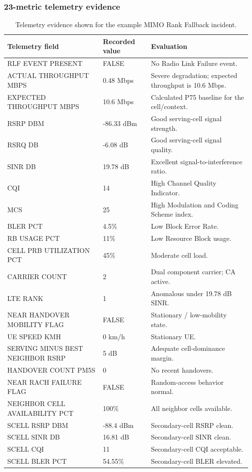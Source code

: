 \documentclass[11pt,a4paper]{article}
\begin{document}
\subsubsection{23-metric telemetry evidence}
\begin{table}[H]
\centering
\scriptsize
\begin{tabularx}{0.98\textwidth}{L{4.5cm} L{3.0cm} Y}
\toprule
\textbf{Telemetry field} & \textbf{Recorded value} & \textbf{Evaluation} \\
\midrule
RLF EVENT PRESENT & FALSE & No Radio Link Failure event. \\
ACTUAL THROUGHPUT MBPS & 0.48 Mbps & Severe degradation; expected throughput is 10.6 Mbps. \\
EXPECTED THROUGHPUT MBPS & 10.6 Mbps & Calculated P75 baseline for the cell/context. \\
RSRP DBM & -86.33 dBm & Good serving-cell signal strength. \\
RSRQ DB & -6.08 dB & Good serving-cell signal quality. \\
SINR DB & 19.78 dB & Excellent signal-to-interference ratio. \\
CQI & 14 & High Channel Quality Indicator. \\
MCS & 25 & High Modulation and Coding Scheme index. \\
BLER PCT & 4.5\% & Low Block Error Rate. \\
RB USAGE PCT & 11\% & Low Resource Block usage. \\
CELL PRB UTILIZATION PCT & 45\% & Moderate cell load. \\
CARRIER COUNT & 2 & Dual component carrier; CA active. \\
LTE RANK & 1 & Anomalous under 19.78 dB SINR. \\
NEAR HANDOVER MOBILITY FLAG & FALSE & Stationary / low-mobility state. \\
UE SPEED KMH & 0 km/h & Stationary UE. \\
SERVING MINUS BEST NEIGHBOR RSRP & 5 dB & Adequate cell-dominance margin. \\
HANDOVER COUNT PM5S & 0 & No recent handovers. \\
NEAR RACH FAILURE FLAG & FALSE & Random-access behavior normal. \\
NEIGHBOR CELL AVAILABILITY PCT & 100\% & All neighbor cells available. \\
SCELL RSRP DBM & -88.4 dBm & Secondary-cell RSRP clean. \\
SCELL SINR DB & 16.81 dB & Secondary-cell SINR clean. \\
SCELL CQI & 11 & Secondary-cell CQI acceptable. \\
SCELL BLER PCT & 54.55\% & Secondary-cell BLER elevated. \\
\bottomrule
\end{tabularx}
\caption{Telemetry evidence shown for the example MIMO Rank Fallback incident.}
\label{tab:inc-657-grid-ug}
\end{table}
\end{document}
